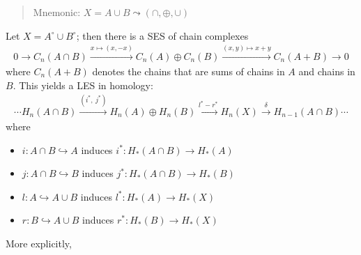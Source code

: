 \begin{theorem}

\begin{quote}
Mnemonic: \(X = A \cup B \leadsto (\cap, \oplus, \cup)\)
\end{quote}

Let \(X = A^\circ \cup B^\circ\); then there is a SES of chain complexes
\begin{align*}
0 \to C_{n}(A\cap B) \xrightarrow{x\mapsto (x, -x)} C_{n}(A) \oplus C_{n}(B) \xrightarrow{(x, y) \mapsto x+y} C_{n}(A + B) \to 0
\end{align*}
where \(C_{n}(A+B)\) denotes the chains that are sums of chains in \(A\)
and chains in \(B\). This yields a LES in homology:
\begin{align*}
\cdots  H_{n}(A \cap B) \xrightarrow{(i^*,~ j^*)} H_{n}(A) \oplus H_{n}(B) \xrightarrow{l^* - r^*}  H_{n}(X) \xrightarrow{\delta} H_{n-1}(A\cap B)\cdots
\end{align*}
where

\begin{itemize}
\item
  \(i: A\cap B \hookrightarrow A\) induces
  \(i^*: H_*(A\cap B) \to H_*(A)\)
\item
  \(j: A\cap B \hookrightarrow B\) induces
  \(j^*: H_*(A\cap B) \to H_*(B)\)
\item
  \(l: A \hookrightarrow A\cup B\) induces \(l^*: H_*(A) \to H_*(X)\)
\item
  \(r: B \hookrightarrow A\cup B\) induces \(r^*: H_*(B) \to H_*(X)\)
\end{itemize}

More explicitly,

\begin{center}
\end{center}


\end{theorem}
